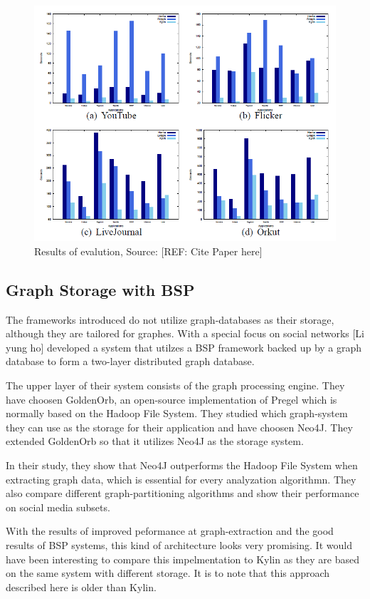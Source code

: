 \documentclass{acm_proc_article-sp}
\begin{document}
\begin{figure}[hbtp]
	\centering
	\includegraphics[scale=0.4]{kylin_results.png}
	\caption{Results of evalution, Source: [REF: Cite Paper here]}
\end{figure}

\subsection{Graph Storage with BSP}

The frameworks introduced do not utilize graph-databases as their storage, although they are tailored for graphes. With a special focus on social networks [Li yung ho] developed a system that utilzes a BSP framework backed up by a graph database to form a two-layer distributed graph database.

The upper layer of their system consists of the graph processing engine. They have choosen GoldenOrb, an open-source implementation of Pregel which is normally based on the Hadoop File System. They studied which graph-system they can use as the storage for their application and have choosen Neo4J. They extended GoldenOrb so that it utilizes Neo4J as the storage system.

In their study, they show that Neo4J outperforms the Hadoop File System when extracting graph data, which is essential for every analyzation algorithmn. They also compare different graph-partitioning algorithms and show their performance on social media subsets.

With the results of improved peformance at graph-extraction and the good results of BSP systems, this kind of architecture looks very promising. It would have been interesting to compare this impelmentation to Kylin as they are based on the same system with different storage. It is to note that this approach described here is older than Kylin.
\end{document}

